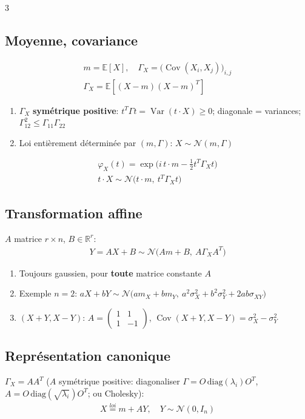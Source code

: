 \documentclass[12pt, a4paper]{article}
\newcommand{\E}{\mathbb{E}}
\newcommand{\R}{\mathbb{R}}
\newcommand{\Var}{\operatorname{Var}}
\newcommand{\Cov}{\operatorname{Cov}}
\begin{document}
\begin{multicols*}{3}
	\subsection{Moyenne, covariance}
	\begin{gather*}
		m=\E[X],\quad\Gamma_X=\big(\Cov(X_i,X_j)\big)_{i,j}\\ \Gamma_X=\E[(X-m)(X-m)^T]
	\end{gather*}
	\begin{enumerate}[\roman*.]
		\item $\Gamma_X$ \textbf{symétrique positive}: $t^T\Gamma t=\Var(t\cdot X)\geq0$; diagonale = variances; $\Gamma_{12}^2\leq\Gamma_{11}\Gamma_{22}$
		\item Loi entièrement déterminée par $(m,\Gamma)$: $X\sim\mathcal N(m,\Gamma)$
	\end{enumerate}
	\begin{gather*}
		\varphi_X(t)=\exp\Big(i\,t\cdot m-\frac12t^T\Gamma_Xt\Big)\\
		t\cdot X\sim\mathcal N\big(t\cdot m,\ t^T\Gamma_Xt\big)
	\end{gather*}

	\subsection{Transformation affine}
	$A$ matrice $r\times n$, $B\in\R^r$:
	\begin{gather*}
		Y=AX+B\sim\mathcal N\big(Am+B,\ A\Gamma_XA^T\big)
	\end{gather*}
	\begin{enumerate}[\roman*.]
		\item Toujours gaussien, pour \textbf{toute} matrice constante $A$
		\item Exemple $n=2$: $aX+bY\sim\mathcal N\big(am_X+bm_Y,\ a^2\sigma_X^2+b^2\sigma_Y^2+2ab\sigma_{XY}\big)$
		\item $(X+Y,X-Y)$: $A=\begin{pmatrix}1&1\\1&-1\end{pmatrix}$, $\Cov(X+Y,X-Y)=\sigma_X^2-\sigma_Y^2$
	\end{enumerate}

	\subsection{Représentation canonique}
	$\Gamma_X=AA^T$ ($A$ symétrique positive: diagonaliser $\Gamma=O\,\mathrm{diag}(\lambda_i)O^T$, $A=O\,\mathrm{diag}(\sqrt{\lambda_i})O^T$; ou Cholesky):
	\begin{gather*}
		X\overset{loi}=m+AY,\quad Y\sim\mathcal N(0,I_n)
	\end{gather*}


\end{multicols*}
\end{document}
